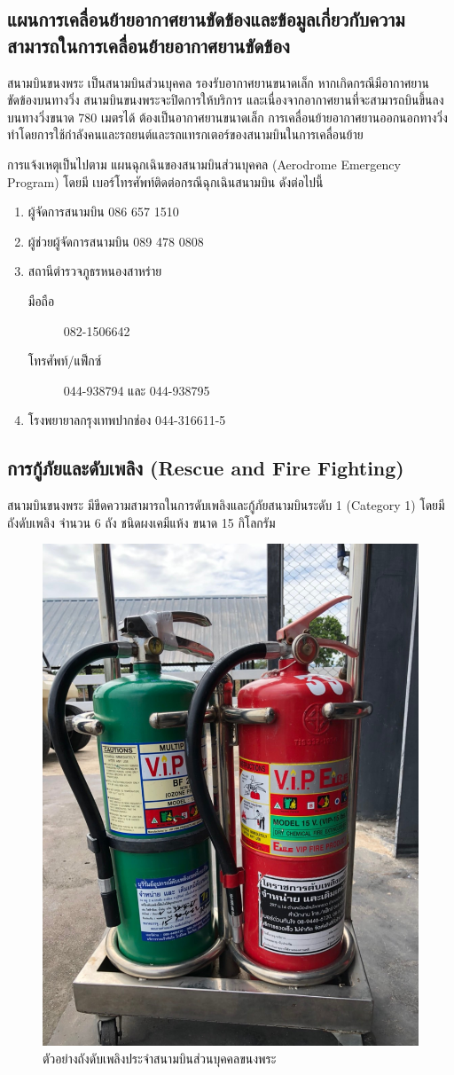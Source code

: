 \subsection{แผนการเคลื่อนย้ายอากาศยานขัดข้องและข้อมูลเกี่ยวกับความสามารถในการเคลื่อนย้ายอากาศยานขัดข้อง}

สนามบินขนงพระ เป็นสนามบินส่วนบุคคล รองรับอากาศยานขนาดเล็ก หากเกิดกรณีมีอากาศยานขัดข้องบนทางวิ่ง สนามบินขนงพระจะปิดการให้บริการ และเนื่องจากอากาศยานที่จะสามารถบินขึ้นลง บนทางวิ่งขนาด 780 เมตรได้ ต้องเป็นอากาศยานขนาดเล็ก การเคลื่อนย้ายอากาศยานออกนอกทางวิ่งทำโดยการใช้กำลังคนและรถยนต์และรถแทรกเตอร์ของสนามบินในการเคลื่อนย้าย

การแจ้งเหตุเป็นไปตาม แผนฉุกเฉินของสนามบินส่วนบุคคล (Aerodrome Emergency Program) โดยมี เบอร์โทรศัพท์ติดต่อกรณีฉุกเฉินสนามบิน ดังต่อไปนี้

\begin{enumerate}
\item ผู้จัดการสนามบิน 086 657 1510
\item ผู้ช่วยผู้จัดการสนามบิน 089 478 0808
\item สถานีตำรวจภูธรหนองสาหร่าย
	\begin{description}
		\item[มือถือ] 082-1506642
		\item[โทรศัพท์/แฟ็กซ์] 044-938794 และ 044-938795
\end{description}
\item โรงพยายาลกรุงเทพปากช่อง 044-316611-5
\end{enumerate}

\subsection{การกู้ภัยและดับเพลิง (Rescue and Fire Fighting)}

สนามบินขนงพระ มีขีดความสามารถในการดับเพลิงและกู้ภัยสนามบินระดับ 1 (Category 1) โดยมี ถังดับเพลิง จำนวน 6 ถัง ชนิดผงเคมีแห้ง ขนาด 15 กิโลกรัม

\begin{figure}[h!]
\begin{center}
\includegraphics[width=0.4\linewidth]{images/Fire_Extinguisher.jpg}
\caption{ตัวอย่างถังดับเพลิงประจำสนามบินส่วนบุคคลขนงพระ}
\label{ตัวอย่างถังดับเพลิงประจำสนามบินส่วนบุคคลขนงพระ}
\end{center}
\end{figure}
